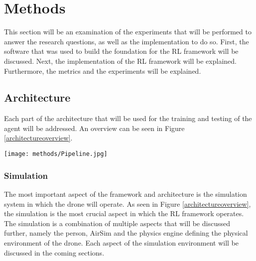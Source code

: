 \section{Methods}
This section will be an examination of the experiments that will be performed to answer 
the research questions, as well as the implementation to do so. First, the software that was 
used to build the foundation for the RL framework will be discussed. Next, the implementation 
of the RL framework will be explained. Furthermore, the metrics and the experiments 
will be explained. 

\subsection{Architecture}
Each part of the architecture that will be used for the training and testing of 
the agent will 
be addressed. An overview can be seen in Figure \ref{architectureoverview}. \newline

\begin{Figure}
    \centering
    \texttt{[image: methods/Pipeline.jpg]}
    \label{architectureoverview}
\end{Figure}

\subsubsection{Simulation}
The most important aspect of the framework and architecture is the simulation system 
in which the drone will operate. As seen in Figure \ref{architectureoverview}, the 
simulation is the most crucial aspect in which the RL framework operates. The 
simulation is a combination of multiple aspects that will be discussed further, namely 
the person, AirSim and the physics engine defining the physical environment of the drone. 
Each aspect of the simulation environment will be discussed in the coming sections. \newline 

